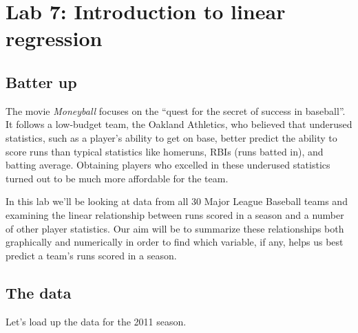\documentclass[11pt]{article}
\begin{document}

\section*{Lab 7: Introduction to linear regression}

\subsection*{Batter up}
The movie \emph{Moneyball} focuses on the ``quest for the secret of success in baseball''.  It follows a low-budget team, the Oakland Athletics, who believed that underused statistics, such as a player's ability to get on base, better predict the ability to score runs than typical statistics like homeruns, RBIs (runs batted in), and batting average.  Obtaining players who excelled in these underused statistics turned out to be much more affordable for the team.

In this lab we'll be looking at data from all 30 Major League Baseball teams and examining the linear relationship between runs scored in a season and a number of other player statistics.  Our aim will be to summarize these relationships both graphically and numerically in order to find which variable, if any, helps us best predict a team's runs scored in a season.

\subsection*{The data}
Let's load up the data for the 2011 season.

\ttfamily\noindent
\hlstd{}\hspace*{\fill}\\
\hlkeyword{(}\hlkeyword{,}{\ }\hlargument{=}{\ }\hlkeyword{)}\hspace*{\fill}\\
\hlstd{}\hlkeyword{(}\hlkeyword{)}\hspace*{\fill}\\
\normalfont
\end{document}
